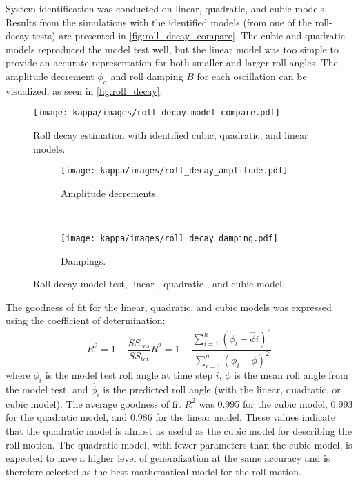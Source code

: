 System identification was conducted on linear, quadratic, and cubic models. Results from the simulations with the identified models (from one of the roll-decay tests) are presented in \autoref{fig:roll_decay_compare}. The cubic and quadratic models reproduced the model test well, but the linear model was too simple to provide an accurate representation for both smaller and larger roll angles. 
The amplitude decrement $\phi_a$ and roll damping $B$ for each oscillation can be visualized, as seen in \autoref{fig:roll_decay}.
\begin{figure}[h!] \centering \texttt{[image: kappa/images/roll\_decay\_model\_compare.pdf]} \caption{Roll decay estimation with identified cubic, quadratic, and linear models.} \label{fig:roll_decay_compare} \end{figure}
\begin{figure}[h!] \begin{subfigure}[b]{0.45\textwidth} \centering \texttt{[image: kappa/images/roll\_decay\_amplitude.pdf]} \caption{Amplitude decrements.} \label{fig:roll_decay_amplitude} \end{subfigure} ~ %
\begin{subfigure}[b]{0.45\textwidth} \centering \texttt{[image: kappa/images/roll\_decay\_damping.pdf]} \caption{Dampings.} \label{fig:roll_decay_damping} \end{subfigure} \caption{Roll decay model test, linear-, quadratic-, and cubic-model.} \label{fig:roll_decay} \end{figure}

The goodness of fit for the linear, quadratic, and cubic models was expressed using the coefficient of determination: 
\begin{equation} \label{eq:R2} 
R^2=1-\frac{SS_{res}}{SS_{tot}} R^2=1-\frac{\sum_{i=1}^{n}(\phi_{i}-\hat{\phi}i)^2}{\sum_{i=1}^{n}(\phi_i-\bar \phi)^2} 
\end{equation} 
where $\phi_i$ is the model test roll angle at time step $i$, $\bar \phi$ is the mean roll angle from the model test, and $\hat{\phi}_i$ is the predicted roll angle (with the linear, quadratic, or cubic model). The average goodness of fit $R^2$ was 0.995 for the cubic model, 0.993 for the quadratic model, and 0.986 for the linear model. These values indicate that the quadratic model is almost as useful as the cubic model for describing the roll motion. The quadratic model, with fewer parameters than the cubic model, is expected to have a higher level of generalization at the same accuracy and is therefore selected as the best mathematical model for the roll motion.